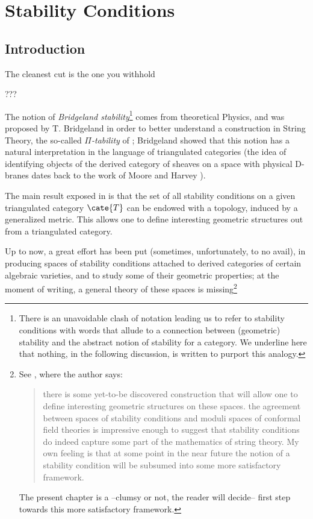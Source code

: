 \chapter{Stability Conditions}\label{chap:stabilities}
\def\semi{\angle\!}
\newcommand{\thin}{\asymp}
\def\cab{\CC_{[a,b)}}
\def\R{\mathbb{R}}
\def\eps{\varepsilon}
\def\sl{\text{\japanese{切}}}
\section{Introduction}
\epigraph{The cleanest cut is the one you withhold}{???}
The notion of \emph{Bridgeland stability}\footnote{There is an unavoidable clash of notation leading us to refer to stability conditions with words that allude to a connection between (geometric) stability and the abstract notion of stability for a category. We underline here that nothing, in the following discussion, is written to purport this analogy.} comes from theoretical Physics, and was proposed by T\@. Bridgeland in order to better understand a construction in String Theory, the so\hyp{}called \emph{$\Pi$\hyp{}tability} of \cite{douglas2002dirichlet,douglas2001d}; Bridgeland showed that this notion has a natural interpretation in the language of triangulated categories (the idea of identifying objects of the derived category of sheaves on a space with physical D\hyp{}branes dates back to the work of Moore and Harvey \cite{harvey1998algebras}). 

The main result exposed in \cite{Brid,Bridge2} is that the set of all stability conditions on a given triangulated category $\cate{T}$ can be endowed with a topology, induced by a generalized metric. This allows one to define interesting geometric structures out from a triangulated category.

Up to now, a great effort has been put (sometimes, unfortunately, to no avail), in producing spaces of stability conditions attached to derived categories of certain algebraic varieties, and to study some of their geometric properties; at the moment of writing, a general theory of these spaces is missing\footnote{See \cite{Bridge2}, where the author says:
\begin{quote}
there is some yet\hyp{}to\hyp{}be discovered construction that will allow one to define interesting geometric structures on these spaces. \omissis the agreement between spaces of stability conditions and moduli spaces of conformal field theories is impressive enough to suggest that stability conditions do indeed capture some part
of the mathematics of string theory. My own feeling is that at some point in the near future the notion of a stability condition will be subsumed into some more satisfactory framework.
\end{quote}
The present chapter is a --clumsy or not, the reader will decide-- first step towards this more satisfactory framework.}

